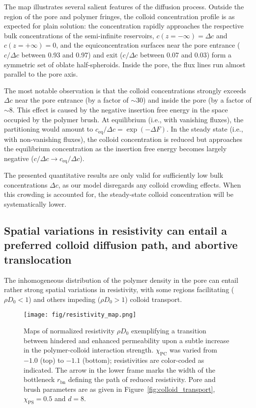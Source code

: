 \documentclass[12pt, a4paper]{article}
\begin{document}
The map illustrates several salient features of the diffusion process.
Outside the region of the pore and polymer fringes, the colloid concentration profile is as expected for plain solution: the concentration rapidly approaches the respective bulk concentrations of the semi-infinite reservoirs, $c(z = -\infty) = \Delta c$ and $c(z = +\infty) = 0$, and the equiconcentration surfaces near the pore entrance ($c/\Delta c$ between 0.93 and 0.97) and exit ($c/\Delta c$ between 0.07 and 0.03) form a symmetric set of oblate half-spheroids.
Inside the pore, the flux lines run almost parallel to the pore axis.

The most notable observation is that the colloid concentrations strongly exceeds $\Delta c$ near the pore entrance (by a factor of $\sim30$) and inside the pore (by a factor  of $\sim8$.
This effect is caused by the negative insertion free energy in the space occupied by the polymer brush.
At equilibrium (i.e., with vanishing fluxes), the partitioning would amount to $c_{\text{eq}}/\Delta c = \exp\left( -\Delta F \right)$.
In the steady state (i.e., with non-vanishing fluxes), the colloid concentration is reduced but approaches the equilibrium concentration as the insertion free energy becomes largely negative ($c/\Delta c \to c_{\text{eq}}/\Delta c$).

The presented quantitative results are only valid for sufficiently low bulk concentrations $\Delta c$, as our model disregards any colloid crowding effects.
When this crowding is accounted for, the steady-state colloid concentration will be systematically lower.


\subsection{Spatial variations in resistivity can entail a preferred colloid diffusion path, and abortive translocation}

The inhomogeneous distribution of the polymer density in the pore can entail rather strong spatial variations in resistivity, with some regions facilitating ($\rho D_0 < 1$) and others impeding ($\rho D_0 > 1$) colloid transport.

\begin{figure}
    \centering
    \texttt{[image: fig/resistivity\_map.png]}
    \caption{
    Maps of normalized resistivity $\rho D_0$ exemplifying a transition between hindered and enhanced permeability upon a subtle increase in the polymer-colloid interaction strength.
    $\chi_{\text{PC}}$ was varied from $-1.0$ (top) to $-1.1$ (bottom); resistivities are color-coded as indicated.
    The arrow in the lower frame marks the width of the bottleneck $r_{\text{bn}}$ defining the path of reduced resistivity.
    Pore and brush parameters are as given in Figure~\ref{fig:colloid_transport}, $\chi_{\text{PS}}=0.5$ and $d=8$.
    }
    \label{fig:R_map}
\end{figure}
\end{document}
